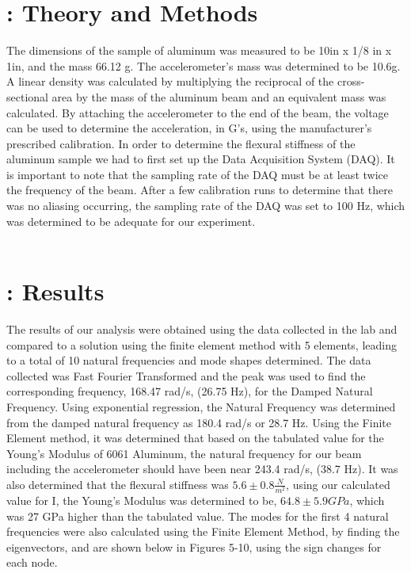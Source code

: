\documentclass[a4paper, 12pt]{article}
\begin{document}
\section{: Theory and Methods}
The dimensions of the sample of aluminum was measured to be 10in x 1/8 in x 1in, and the mass 66.12 g. The accelerometer's mass was determined to be 10.6g. A linear density was calculated by multiplying the reciprocal of the cross-sectional area by the mass of the aluminum beam and an equivalent mass was calculated. By attaching the accelerometer to the end of the beam, the voltage can be used to determine the acceleration, in G's, using the manufacturer's prescribed calibration. In order to determine the flexural stiffness of the aluminum sample we had to first set up the Data Acquisition System (DAQ). It is important to note that the sampling rate of the DAQ must be at least twice the frequency of the beam. After a few calibration runs to determine that there was no aliasing occurring, the sampling rate of the DAQ was set to 100 Hz, which was determined to be adequate for our experiment.\\\\
\section{: Results}
The results of our analysis were obtained using the data collected in the lab and compared to a solution using the finite element method with 5 elements, leading to a total of 10 natural frequencies and mode shapes determined. The data collected was Fast Fourier Transformed and the peak was used to find the corresponding frequency, 168.47 rad/s, (26.75 Hz), for the Damped Natural Frequency. Using exponential regression, the Natural Frequency was determined from the damped natural frequency as 180.4 rad/s or 28.7 Hz. Using the Finite Element method, it was determined that based on the tabulated value for the Young's Modulus of 6061 Aluminum, the natural frequency for our beam including the accelerometer should have been near 243.4 rad/s, (38.7 Hz). It was also determined that the flexural stiffness was $5.6 \pm 0.8 \frac{N}{m^2}$, using our calculated value for I, the Young's Modulus was determined to be, $64.8 \pm 5.9 GPa$, which was 27 GPa higher than the tabulated value. The modes for the first 4 natural frequencies were also calculated using the Finite Element Method, by finding the eigenvectors, and are shown below in Figures 5-10, using the sign changes for each node.
\end{document}

